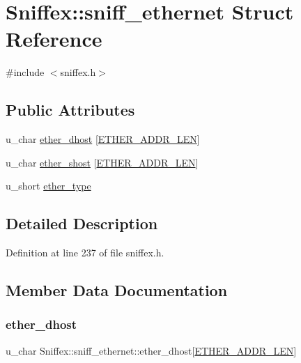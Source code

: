 \hypertarget{struct_sniffex_1_1sniff__ethernet}{}\section{Sniffex\+:\+:sniff\+\_\+ethernet Struct Reference}
\label{struct_sniffex_1_1sniff__ethernet}


{\ttfamily \#include $<$sniffex.\+h$>$}

\subsection*{Public Attributes}
\begin{DoxyCompactItemize}
\item 
u\+\_\+char \mbox{\hyperlink{struct_sniffex_1_1sniff__ethernet_a68600307767c3cfe20ba593423abec8b}{ether\+\_\+dhost}} \mbox{[}\mbox{\hyperlink{sniffex_8h_abf4fcaacb1ad2010711b7c880ec2ed20}{E\+T\+H\+E\+R\+\_\+\+A\+D\+D\+R\+\_\+\+L\+EN}}\mbox{]}
\item 
u\+\_\+char \mbox{\hyperlink{struct_sniffex_1_1sniff__ethernet_af40407403f51872c064c28298441b2d9}{ether\+\_\+shost}} \mbox{[}\mbox{\hyperlink{sniffex_8h_abf4fcaacb1ad2010711b7c880ec2ed20}{E\+T\+H\+E\+R\+\_\+\+A\+D\+D\+R\+\_\+\+L\+EN}}\mbox{]}
\item 
u\+\_\+short \mbox{\hyperlink{struct_sniffex_1_1sniff__ethernet_a31b8a8e9232feffeeb747f949580753a}{ether\+\_\+type}}
\end{DoxyCompactItemize}


\subsection{Detailed Description}


Definition at line 237 of file sniffex.\+h.



\subsection{Member Data Documentation}
\mbox{\label{struct_sniffex_1_1sniff__ethernet_a68600307767c3cfe20ba593423abec8b}} 
\subsubsection{\texorpdfstring{ether\+\_\+dhost}{ether\_dhost}}
{\footnotesize\ttfamily u\+\_\+char Sniffex\+::sniff\+\_\+ethernet\+::ether\+\_\+dhost\mbox{[}\mbox{\hyperlink{sniffex_8h_abf4fcaacb1ad2010711b7c880ec2ed20}{E\+T\+H\+E\+R\+\_\+\+A\+D\+D\+R\+\_\+\+L\+EN}}\mbox{]}}



